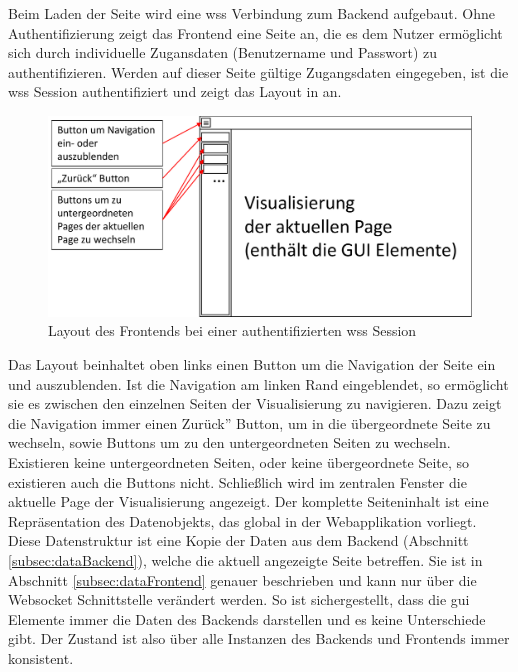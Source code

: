 Beim Laden der Seite wird eine \ac{wss} Verbindung zum Backend aufgebaut.
Ohne Authentifizierung zeigt das Frontend eine Seite an, 
die es dem Nutzer ermöglicht sich durch individuelle Zugansdaten (Benutzername und Passwort) zu authentifizieren. %
Werden auf dieser Seite gültige Zugangsdaten eingegeben, ist die \ac{wss} Session authentifiziert und 
zeigt das Layout in  an.
\begin{figure}[ht]
  \centering
  \includegraphics[width=\textwidth]{content/hauptteil/systemEntwurf/res/LayoutFrontend.pdf}
  \caption[Frontend Layout]{Layout des Frontends bei einer authentifizierten \acs{wss} Session}
  \label{fig:pageLayoutFrontendAuthenticated}
\end{figure}
Das Layout beinhaltet oben links einen Button um die Navigation der Seite ein und auszublenden.
Ist die Navigation am linken Rand eingeblendet, so ermöglicht sie es zwischen den einzelnen Seiten der Visualisierung zu navigieren.
Dazu zeigt die Navigation immer einen \glqq{}Zurück'' Button, um in die übergeordnete Seite zu wechseln, sowie Buttons um zu den untergeordneten Seiten zu wechseln.
Existieren keine untergeordneten Seiten, oder keine übergeordnete Seite, so existieren auch die Buttons nicht.
Schließlich wird im zentralen Fenster die aktuelle Page der Visualisierung angezeigt.
Der komplette Seiteninhalt ist eine Repräsentation des Datenobjekts, das global in der Webapplikation vorliegt.
Diese Datenstruktur ist eine Kopie der Daten aus dem Backend (Abschnitt \ref{subsec:dataBackend}), welche die aktuell angezeigte Seite betreffen.
Sie ist in Abschnitt \ref{subsec:dataFrontend} genauer beschrieben und kann nur über die Websocket Schnittstelle verändert werden. 
So ist sichergestellt, dass die \ac{gui} Elemente immer die Daten des Backends darstellen und es keine Unterschiede gibt.
Der Zustand ist also über alle Instanzen des Backends und Frontends immer konsistent.
